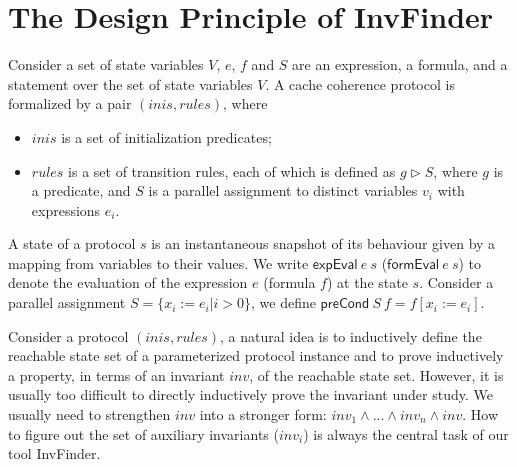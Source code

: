 \documentclass{llncs}
\begin{document}
\section{The Design Principle of {\sf InvFinder}}
Consider a set of state variables $V$,
$e$, $f$ and $S$ are an expression, a formula, and a statement over
the set of state variables $V$. A cache coherence protocol is formalized by a pair $(inis,rules)$,
where
%
\begin{itemize}
\item $inis $ is a set of initialization predicates;

\item $rules$ is a set of transition rules, each of which is defined as
  $g \vartriangleright  S$, where $g$ is a predicate, and $S$ is a
  parallel assignment to distinct  variables $v_i$ with expressions
  $e_i$.
\end{itemize}

A  state of a protocol $s$ is an instantaneous snapshot of its
behaviour given by a mapping from variables to their values. We
write $\mathsf{expEval}~e~s$ ($\mathsf{formEval}~e~s$) to denote the
evaluation of the expression $e$ (formula $f$) at the state $s$.
Consider a parallel assignment  $S=\{x_i:=e_i | i>0\}$, we define
$\mathsf{preCond}~S~f=f[x_i:=e_i]$.

Consider a protocol $(inis,rules)$, a natural
idea is to inductively define the reachable state set of a
parameterized protocol instance and to prove inductively a
property, in terms of an invariant $inv$, of the reachable state set.
However, it is usually too difficult to directly inductively prove the invariant under study.
We usually need to strengthen $inv$ into a stronger form:
$inv_1\wedge ...\wedge inv_n \wedge inv$.
How to figure out the set of auxiliary invariants ($inv_i$)
is always the central task of our tool {\sf InvFinder}.
\end{document}
